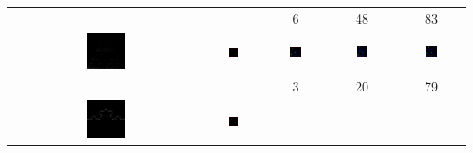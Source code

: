 \documentclass[10pt,a4paper,oneside]{article}
\theoremstyle{definition}
\begin{document}
\begin{table}[p]
\begin{tabular}{c c c c c}
\\
 & & 6 & 48 & 83 \\
    \includegraphics[width=0.2\textwidth]{../img/runs2d/sierpinskioff/data.png}
& 
    \includegraphics[width=0.2\textwidth]{../img/runs2d/sierpinskioff/generation0000.png}
& 
    \includegraphics[width=0.2\textwidth]{../img/runs2d/sierpinskioff/generation0003.png}
& 
    \includegraphics[width=0.2\textwidth]{../img/runs2d/sierpinskioff/generation0020.png}
& 
    \includegraphics[width=0.2\textwidth]{../img/runs2d/sierpinskioff/generation0079.png}
\\    
 &  & 3 & 20 & 79 \\
	\includegraphics[width=0.2\textwidth]{../img/runs2d/koch2/data.png}
& 
    \includegraphics[width=0.2\textwidth]{../img/runs2d/koch2/generation0000.png}

\end{tabular}
\end{table}
\end{document}
